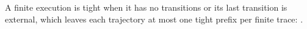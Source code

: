 \begin{definition}
  \label{def:istight}
  \leanok
  A finite execution is tight when it has no transitions or its last transition is external, which leaves each trajectory at most one tight prefix per finite trace: .
\end{definition}
